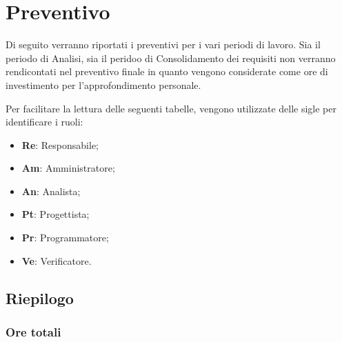\documentclass[../piano-di-progetto.tex]{subfiles}
\begin{document}
  \section{Preventivo}
  Di seguito verranno riportati i preventivi per i vari periodi di lavoro. Sia il periodo di Analisi, sia il peridoo di Consolidamento dei requisiti non verranno rendicontati nel preventivo finale in quanto vengono considerate come ore di investimento per l’approfondimento personale.

  Per facilitare la lettura delle seguenti tabelle, vengono utilizzate delle sigle per identificare i ruoli:
  \begin{itemize}
    \item \textbf{Re}: Responsabile;
    \item \textbf{Am}: Amministratore;
    \item \textbf{An}: Analista;
    \item \textbf{Pt}: Progettista;
    \item \textbf{Pr}: Programmatore;
    \item \textbf{Ve}: Verificatore.
  \end{itemize}

  
  
  
  
  

  \subsection{Riepilogo}
  \subsubsection{Ore totali}
\end{document}
